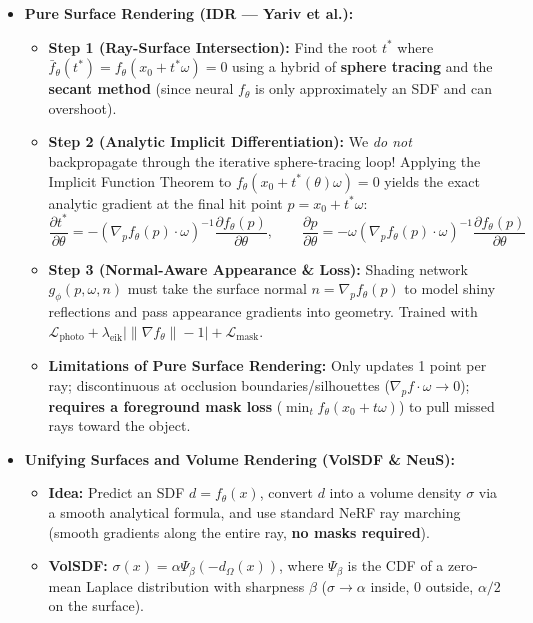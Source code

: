 \documentclass[10pt, a4paper]{article}
\begin{document}
\begin{itemize}
    \item \textbf{Pure Surface Rendering (IDR --- Yariv et al.):}
    \begin{itemize}
        \item \textbf{Step 1 (Ray-Surface Intersection):} Find the root $t^*$ where $\bar{f}_\theta(t^*) = f_\theta(x_0 + t^*\omega) = 0$ using a hybrid of \textbf{sphere tracing} and the \textbf{secant method} (since neural $f_\theta$ is only approximately an SDF and can overshoot).
        \item \textbf{Step 2 (Analytic Implicit Differentiation):} We \emph{do not} backpropagate through the iterative sphere-tracing loop! Applying the Implicit Function Theorem to $f_\theta(x_0 + t^*(\theta)\omega) = 0$ yields the exact analytic gradient at the final hit point $p = x_0 + t^*\omega$:
        $$\frac{\partial t^*}{\partial \theta} = -\left(\nabla_p f_\theta(p) \cdot \omega\right)^{-1} \frac{\partial f_\theta(p)}{\partial \theta}, \qquad \frac{\partial p}{\partial \theta} = -\omega\left(\nabla_p f_\theta(p) \cdot \omega\right)^{-1} \frac{\partial f_\theta(p)}{\partial \theta}$$
        \item \textbf{Step 3 (Normal-Aware Appearance \& Loss):} Shading network $g_\phi(p, \omega, n)$ must take the surface normal $n = \nabla_p f_\theta(p)$ to model shiny reflections and pass appearance gradients into geometry. Trained with $\mathcal{L}_{\text{photo}} + \lambda_{\text{eik}}\big|\|\nabla f_\theta\| - 1\big| + \mathcal{L}_{\text{mask}}$.
        \item \textbf{Limitations of Pure Surface Rendering:} Only updates 1 point per ray; discontinuous at occlusion boundaries/silhouettes ($\nabla_p f \cdot \omega \to 0$); \textbf{requires a foreground mask loss} ($\min_t f_\theta(x_0+t\omega)$) to pull missed rays toward the object.
    \end{itemize}
    \item \textbf{Unifying Surfaces and Volume Rendering (VolSDF \& NeuS):}
    \begin{itemize}
        \item \textbf{Idea:} Predict an SDF $d = f_\theta(x)$, convert $d$ into a volume density $\sigma$ via a smooth analytical formula, and use standard NeRF ray marching (smooth gradients along the entire ray, \textbf{no masks required}).
        \item \textbf{VolSDF:} $\sigma(x) = \alpha \Psi_\beta(-d_\Omega(x))$, where $\Psi_\beta$ is the CDF of a zero-mean Laplace distribution with sharpness $\beta$ ($\sigma \to \alpha$ inside, $0$ outside, $\alpha/2$ on the surface).

\end{itemize}
\end{itemize}
\end{document}
